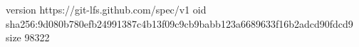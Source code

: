 version https://git-lfs.github.com/spec/v1
oid sha256:9d080b780efb24991387c4b13f09c9cb9babb123a6689633f16b2adcd90fdcd9
size 98322
